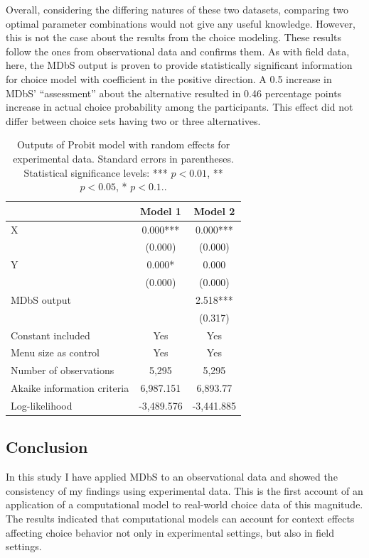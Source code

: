 \documentclass[a4paper,12pt]{article}
\begin{document}
Overall, considering the differing natures of these two datasets, comparing two optimal parameter combinations would not give any useful knowledge. However, this is not the case about the results from the choice modeling. These results follow the ones from observational data and confirms them. As with field data, here, the MDbS output is proven to provide statistically significant information for choice model with coefficient in the positive direction. A 0.5 increase in MDbS' ``assessment'' about the alternative resulted in 0.46 percentage points increase in actual choice probability among the participants. This effect did not differ between choice sets having two or three alternatives.

\begin{table}
    \centering
    \renewcommand{\arraystretch}{1.5}
    \begin{tabular}{lcc}
    \hline
     & Model 1 & Model 2 \\
    \hline
    X & 0.000*** & 0.000*** \\
     & ($0.000$) & ($0.000$) \\[1ex]
    Y & 0.000* & 0.000 \\
     & ($0.000$) & ($0.000$) \\[1ex]
    MDbS output & & 2.518*** \\
     & & (0.317) \\[1ex]
    Constant included & Yes & Yes \\[1ex]
    Menu size as control & Yes & Yes \\[1ex]
    Number of observations & 5,295 & 5,295 \\[1ex]
    Akaike information criteria & 6,987.151 & 6,893.77 \\[1ex]
    Log-likelihood & -3,489.576 & -3,441.885 \\
    \hline
    \end{tabular}
    \caption[Outputs of Probit model for experimental data]{Outputs of Probit model with random effects for experimental data. Standard errors in parentheses. Statistical significance levels: *** $p<0.01$, ** $p<0.05$, * $p<0.1.$.}
    \label{tab:noguchiProbitResults}
\end{table}

\subsection{Conclusion}

In this study I have applied MDbS to an observational data and showed the consistency of my findings using experimental data. This is the first account of an application of a computational model to real-world choice data of this magnitude. The results indicated that computational models can account for context effects affecting choice behavior not only in experimental settings, but also in field settings.
\end{document}
